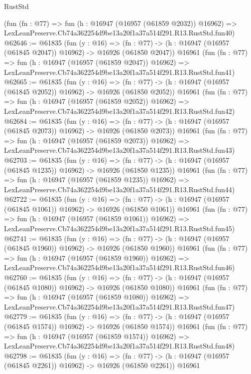 \begin{lexlean}{RustStd}
\begin{coremodule}
    (fun (fn : @77) =>
    fun (h : @16947 (@16957 (@61859 @2032)) @16962) =>
    LexLeanPreserve.Cb74a362254d9be13a20f1a37a514f291.R13.RustStd.fun40)
@62646 := @61835
    (fun (y : @16) =>
    (fn : @77) -> (h : @16947 (@16957 (@61845 @2047)) @16962) -> @16926 (@61850 @2047))
    @16961
    (fun (fn : @77) =>
    fun (h : @16947 (@16957 (@61859 @2047)) @16962) =>
    LexLeanPreserve.Cb74a362254d9be13a20f1a37a514f291.R13.RustStd.fun41)
@62665 := @61835
    (fun (y : @16) =>
    (fn : @77) -> (h : @16947 (@16957 (@61845 @2052)) @16962) -> @16926 (@61850 @2052))
    @16961
    (fun (fn : @77) =>
    fun (h : @16947 (@16957 (@61859 @2052)) @16962) =>
    LexLeanPreserve.Cb74a362254d9be13a20f1a37a514f291.R13.RustStd.fun42)
@62684 := @61835
    (fun (y : @16) =>
    (fn : @77) -> (h : @16947 (@16957 (@61845 @2073)) @16962) -> @16926 (@61850 @2073))
    @16961
    (fun (fn : @77) =>
    fun (h : @16947 (@16957 (@61859 @2073)) @16962) =>
    LexLeanPreserve.Cb74a362254d9be13a20f1a37a514f291.R13.RustStd.fun43)
@62703 := @61835
    (fun (y : @16) =>
    (fn : @77) -> (h : @16947 (@16957 (@61845 @1235)) @16962) -> @16926 (@61850 @1235))
    @16961
    (fun (fn : @77) =>
    fun (h : @16947 (@16957 (@61859 @1235)) @16962) =>
    LexLeanPreserve.Cb74a362254d9be13a20f1a37a514f291.R13.RustStd.fun44)
@62722 := @61835
    (fun (y : @16) =>
    (fn : @77) -> (h : @16947 (@16957 (@61845 @1061)) @16962) -> @16926 (@61850 @1061))
    @16961
    (fun (fn : @77) =>
    fun (h : @16947 (@16957 (@61859 @1061)) @16962) =>
    LexLeanPreserve.Cb74a362254d9be13a20f1a37a514f291.R13.RustStd.fun45)
@62741 := @61835
    (fun (y : @16) =>
    (fn : @77) -> (h : @16947 (@16957 (@61845 @1960)) @16962) -> @16926 (@61850 @1960))
    @16961
    (fun (fn : @77) =>
    fun (h : @16947 (@16957 (@61859 @1960)) @16962) =>
    LexLeanPreserve.Cb74a362254d9be13a20f1a37a514f291.R13.RustStd.fun46)
@62760 := @61835
    (fun (y : @16) =>
    (fn : @77) -> (h : @16947 (@16957 (@61845 @1080)) @16962) -> @16926 (@61850 @1080))
    @16961
    (fun (fn : @77) =>
    fun (h : @16947 (@16957 (@61859 @1080)) @16962) =>
    LexLeanPreserve.Cb74a362254d9be13a20f1a37a514f291.R13.RustStd.fun47)
@62779 := @61835
    (fun (y : @16) =>
    (fn : @77) -> (h : @16947 (@16957 (@61845 @1574)) @16962) -> @16926 (@61850 @1574))
    @16961
    (fun (fn : @77) =>
    fun (h : @16947 (@16957 (@61859 @1574)) @16962) =>
    LexLeanPreserve.Cb74a362254d9be13a20f1a37a514f291.R13.RustStd.fun48)
@62798 := @61835
    (fun (y : @16) =>
    (fn : @77) -> (h : @16947 (@16957 (@61845 @2261)) @16962) -> @16926 (@61850 @2261))
    @16961

\end{coremodule}
\end{lexlean}
